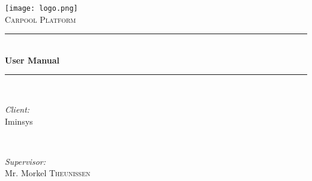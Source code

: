 \documentclass[12pt]{article}
\begin{document}
\begin{titlepage}

\newcommand{\HRule}{\rule{\linewidth}{0.5mm}} %

\center %


\texttt{[image: logo.png]}\\[1cm]
 


\textsc{\LARGE Carpool Platform}\\[1cm]


\HRule \\[0.4cm]
{ \huge \bfseries User Manual}\\[0.4cm]
\HRule \\[1cm]
 

\begin{minipage}{0.4\textwidth}
\begin{flushleft} \large
\emph{Client:}\\
Iminsys 
\end{flushleft}
\end{minipage}
~
\begin{minipage}{0.4\textwidth}
\begin{flushright} \large
\emph{Supervisor:} \\
Mr. Morkel \textsc{Theunissen}
\end{flushright}
\end{minipage}\\[1cm]


\end{titlepage}
\end{document}

